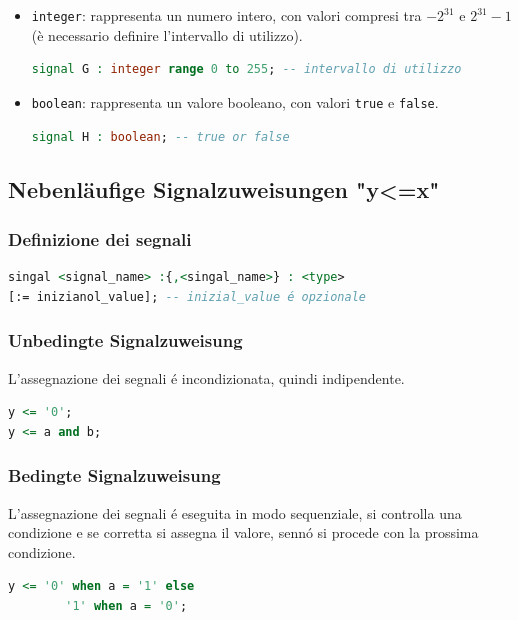 \begin{itemize}
\begin{lstlisting}[language=VHDL]
            \end{lstlisting}
            \item \texttt{integer}: rappresenta un numero intero, con valori compresi tra $-2^{31}$ e $2^{31}-1$ (è necessario definire l'intervallo di utilizzo).
            \begin{lstlisting}[language=VHDL]
signal G : integer range 0 to 255; -- intervallo di utilizzo
            \end{lstlisting}
            \item \texttt{boolean}: rappresenta un valore booleano, con valori \texttt{true} e \texttt{false}.
            \begin{lstlisting}[language=VHDL]
signal H : boolean; -- true or false
            \end{lstlisting}
        \end{itemize}
        
    \subsection{Nebenläufige Signalzuweisungen "y<=x"}
        \subsubsection{Definizione dei segnali}
            \begin{lstlisting}[language=VHDL]
singal <signal_name> :{,<singal_name>} : <type>
[:= inizianol_value]; -- inizial_value é opzionale
            \end{lstlisting}
    
        \subsubsection{Unbedingte Signalzuweisung}
            L'assegnazione dei segnali é incondizionata, quindi indipendente.
            \begin{lstlisting}[language=VHDL]
y <= '0';
y <= a and b;
            \end{lstlisting}
    
        \subsubsection{Bedingte Signalzuweisung}
            L'assegnazione dei segnali é eseguita in modo sequenziale, si controlla una condizione e se corretta si assegna il valore, sennó si procede con la prossima condizione.
            \begin{lstlisting}[language=VHDL]
y <= '0' when a = '1' else 
        '1' when a = '0';
            \end{lstlisting}
    
